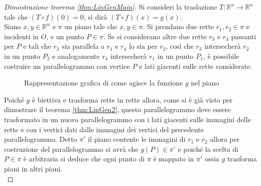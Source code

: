 \begin{proof}[Dimostrazione teorema \ref{thm:LinGenMain}]
	Si consideri la traslazione $T:\mathbb{R}^n \rightarrow\mathbb{R}^n$ tale che $(T\circ f)(0)=0$, si dirà $(T\circ f)(x)=g(x)$.\\
	Siano $x,y\in\mathbb{R}^n$ e $\pi$ un piano tale che $x,y\in\pi$. Si prendano due rette $r_1,r_2\in\pi$ e incidenti in $O$, e un punto $P\in\pi$. Se si considerano altre due rette $r_3$ e $r_4$ passanti per $P$ e tali che $r_3$ sia parallela a $r_1$ e $r_4$ lo sia per $r_2$, così che $r_3$ intersecherà $r_2$ in un punto $P_2$ e analogamente $r_4$ intersecherà $r_1$ in un punto $P_1$, è possibile costruire un parallelogrammo con vertice $P$ e lati giacenti sulle rette considerate.
	\begin{figure}[h!]
		\centering
	\caption{Rappresentazione grafica di come agisce la funzione $g$ nel piano}
	\label{Fig:PianoLinGen2}
\end{figure}
	 Poiché $g$ è biettiva e trasforma rette in rette allora, come si è già visto per dimostrare il teorema \ref{thm:LinGen2}, questo parallelogrammo deve essere trasformato in un nuovo parallelogrammo con i lati giacenti sulle immagini delle rette e con i vertici dati dalle immagini dei vertici del precedente parallelogrammo. Detto $\pi'$ il piano contente le immagini di $r_1$ e $r_2$ allora per costruzione del parallelogrammo si avrà che $g(P)\in \pi'$ e poiché la scelta di $P\in\pi$ è arbitraria si deduce che ogni punto di $\pi$ è mappato in $\pi'$ ossia $g$ trasforma piani in altri piani.\\


\end{proof}
